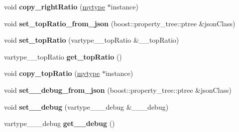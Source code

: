 \begin{DoxyCompactItemize}
\mbox{\label{classfilter_1_1algos_1_1_i_d_plate_rectifier_a202d62e46aee89bdac905dd7f92efc29}} 
void {\bfseries copy\+\_\+right\+Ratio} (\hyperlink{classfilter_1_1algos_1_1_i_d_plate_rectifier}{mytype} $\ast$instance)
\item 
\mbox{\label{classfilter_1_1algos_1_1_i_d_plate_rectifier_ab129a18577712a9cf2a95df8a140f0d9}} 
void {\bfseries set\+\_\+top\+Ratio\+\_\+from\+\_\+json} (boost\+::property\+\_\+tree\+::ptree \&json\+Class)
\item 
\mbox{\label{classfilter_1_1algos_1_1_i_d_plate_rectifier_a1c799ce51ae19558be8a10983be485e6}} 
void {\bfseries set\+\_\+top\+Ratio} (vartype\+\_\+\+\_\+top\+Ratio \&\+\_\+\+\_\+top\+Ratio)
\item 
\mbox{\label{classfilter_1_1algos_1_1_i_d_plate_rectifier_af15ee32f9b540a44407c5aa1291b7dcc}} 
vartype\+\_\+\+\_\+top\+Ratio {\bfseries get\+\_\+top\+Ratio} ()
\item 
\mbox{\label{classfilter_1_1algos_1_1_i_d_plate_rectifier_a55ee84a1e51942c436f841f60fbe06c4}} 
void {\bfseries copy\+\_\+top\+Ratio} (\hyperlink{classfilter_1_1algos_1_1_i_d_plate_rectifier}{mytype} $\ast$instance)
\item 
\mbox{\label{classfilter_1_1algos_1_1_i_d_plate_rectifier_ac459f684974bfcb91af137f0b2c276c2}} 
void {\bfseries set\+\_\+\+\_\+debug\+\_\+from\+\_\+json} (boost\+::property\+\_\+tree\+::ptree \&json\+Class)
\item 
\mbox{\label{classfilter_1_1algos_1_1_i_d_plate_rectifier_a39b0fc9c3e05c9c78d7d6180a652f55a}} 
void {\bfseries set\+\_\+\+\_\+debug} (vartype\+\_\+\+\_\+\+\_\+debug \&\+\_\+\+\_\+\+\_\+debug)
\item 
\mbox{\label{classfilter_1_1algos_1_1_i_d_plate_rectifier_ac50726a9818adadd989cc689f3736fc9}} 
vartype\+\_\+\+\_\+\+\_\+debug {\bfseries get\+\_\+\+\_\+debug} ()

\end{DoxyCompactItemize}
